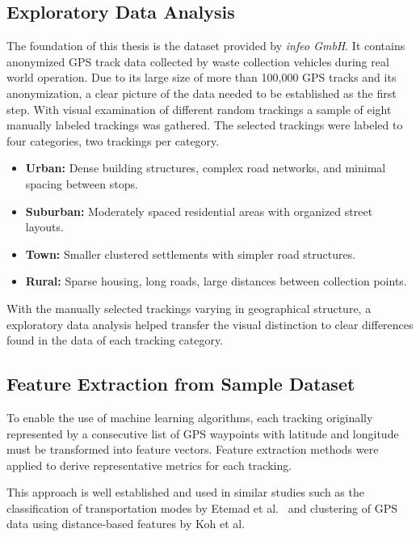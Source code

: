 \documentclass[a4paper,12pt,twoside]{scrreprt}
\begin{document}
\subsection{Exploratory Data Analysis}

The foundation of this thesis is the dataset provided by \textit{infeo GmbH}.
It contains anonymized GPS track data collected by waste collection vehicles
during real world operation. Due to its large size of more than 100,000 GPS
tracks and its anonymization, a clear picture of the data needed to be
established as the first step.
With visual examination of different random trackings a sample of eight
manually labeled trackings was gathered.
The selected trackings were labeled to four categories, two trackings per
category.

\begin{itemize}
  \item \textbf{Urban:} Dense building structures, complex road networks, and
        minimal
        spacing between stops.
  \item \textbf{Suburban:} Moderately spaced residential areas with organized
        street
        layouts.
  \item \textbf{Town:} Smaller clustered settlements with simpler road
        structures.
  \item \textbf{Rural:} Sparse housing, long roads, large distances between
        collection points.
\end{itemize}

With the manually selected trackings varying in geographical structure, a
exploratory data
analysis helped transfer the visual distinction to clear differences found in
the data of each tracking category.

\subsection{Feature Extraction from Sample Dataset}
To enable the use of machine learning algorithms, each tracking originally
represented by a consecutive list of GPS waypoints with latitude and longitude
must be transformed into feature vectors. Feature extraction methods were
applied to derive representative metrics for each tracking.

This approach is well established and used in similar studies such as the
classification
of transportation modes by Etemad et al.~\cite{etemad_predicting_2018} and
clustering of GPS data using distance-based features by Koh et
al.~\cite{koh_clustering_2022}
\end{document}
